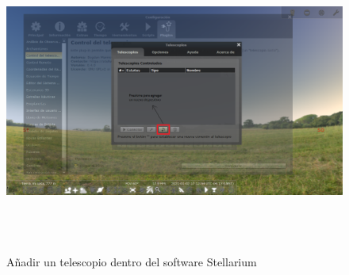 \begin{figure}[H]
	\includegraphics[height=10cm,width=\textwidth]{stell_conf_red_2} 
	\caption{Añadir un telescopio dentro del software Stellarium} 
	\label{fig:stell_conf_red_2}
\end{figure}

